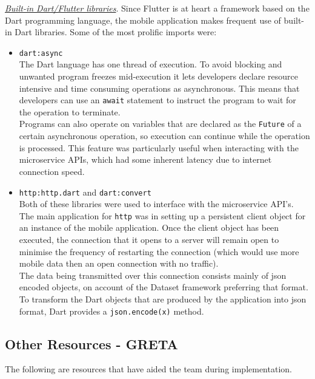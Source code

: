 \documentclass{article}
\begin{document}
    \emph{\href{https://pub.dartlang.org/}{Built-in Dart/Flutter libraries}}. Since Flutter is at heart a framework based on the Dart programming language, the mobile application makes frequent use of built-in Dart libraries. Some of the most prolific imports were:
    \begin{itemize}
        \item \texttt{dart:async} \\[6pt]
        The Dart language has one thread of execution. To avoid blocking and unwanted program freezes mid-execution it lets developers declare resource intensive and time consuming operations as asynchronous. This means that developers can use an \texttt{await} statement to instruct the program to wait for the operation to terminate. \\ [6pt]
        Programs can also operate on variables that are declared as the \texttt{Future} of a certain asynchronous operation, so execution can continue while the operation is processed. This feature was particularly useful when interacting with the microservice APIs, which had some inherent latency due to internet connection speed.
        \item \texttt{http:http.dart} and \texttt{dart:convert} \\[6pt]
        Both of these libraries were used to interface with the microservice API's. The main application for \texttt{http} was in setting up a persistent client object for an instance of the mobile application. Once the client object has been executed, the connection that it opens to a server will remain open to minimise the frequency of restarting the connection (which would use more mobile data then an open connection with no traffic). \\[6pt]
        The data being transmitted over this connection consists mainly of \acrshort{json} encoded objects, on account of the Dataset framework preferring that format. To transform the Dart objects that are produced by the application into \acrshort{json} format, Dart provides a \texttt{json.encode(x)} method.
    \end{itemize}
    
    \subsection{Other Resources - GRETA} 
    \label{subsec:otherresources}

    The following are resources that have aided the team during implementation. \par
    
\end{document}
